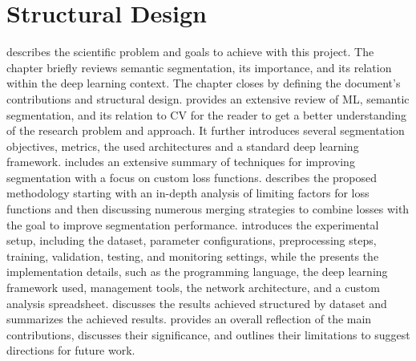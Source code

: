 \section{Structural Design}
 describes the scientific problem and goals to achieve with this project. The chapter briefly reviews semantic segmentation, its importance, and its relation within the deep learning context. The chapter closes by defining the document's contributions and structural design.  provides an extensive review of \acf{ML}, semantic segmentation, and its relation to \acf{CV} for the reader to get a better understanding of the research problem and approach. It further introduces several segmentation objectives, metrics, the used architectures and a standard deep learning framework.  includes an extensive summary of techniques for improving segmentation with a focus on custom loss functions.  describes the proposed methodology starting with an in-depth analysis of limiting factors for loss functions and then discussing numerous merging strategies to combine losses with the goal to improve segmentation performance.  introduces the experimental setup, including the dataset, parameter configurations, preprocessing steps, training, validation, testing, and monitoring settings, while the  presents the implementation details, such as the programming language, the deep learning framework used, management tools, the network architecture, and a custom analysis spreadsheet.  discusses the results achieved structured by dataset and  summarizes the achieved results.  provides an overall reflection of the main contributions, discusses their significance, and outlines their limitations to suggest directions for future work.